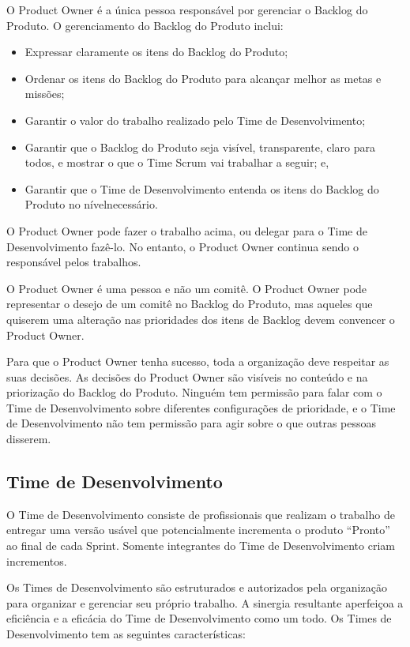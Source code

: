 O Product Owner é a única pessoa responsável por gerenciar o Backlog do Produto. O
gerenciamento do Backlog do Produto inclui:

\begin{itemize}
\item  Expressar claramente os itens do Backlog do Produto;
\item Ordenar os itens do Backlog do Produto para alcançar melhor as metas e missões;
\item  Garantir o valor do trabalho realizado pelo Time de Desenvolvimento;
\item  Garantir que o Backlog do Produto seja visível, transparente, claro para todos, e mostrar o que o Time Scrum vai trabalhar a seguir; e,
\item Garantir que o Time de Desenvolvimento entenda os itens do Backlog do Produto no nívelnecessário.
\end{itemize}

O Product Owner pode fazer o trabalho acima, ou delegar para o Time de Desenvolvimento
fazê-lo. No entanto, o Product Owner continua sendo o responsável pelos trabalhos.

O Product Owner é uma pessoa e não um comitê. O Product Owner pode representar o desejo
de um comitê no Backlog do Produto, mas aqueles que quiserem uma alteração nas
prioridades dos itens de Backlog devem convencer o Product Owner.

Para que o Product Owner tenha sucesso, toda a organização deve respeitar as suas decisões.
As decisões do Product Owner são visíveis no conteúdo e na priorização do Backlog do
Produto. Ninguém tem permissão para falar com o Time de Desenvolvimento sobre diferentes
configurações de prioridade, e o Time de Desenvolvimento não tem permissão para agir sobre
o que outras pessoas disserem.

\subsection{Time de Desenvolvimento}
\label{sub:Time de Desenvolvimento}

O Time de Desenvolvimento consiste de profissionais que realizam o trabalho de entregar uma
versão usável que potencialmente incrementa o produto “Pronto” ao final de cada Sprint.
Somente integrantes do Time de Desenvolvimento criam incrementos.

Os Times de Desenvolvimento são estruturados e autorizados pela organização para organizar
e gerenciar seu próprio trabalho. A sinergia resultante aperfeiçoa a eficiência e a eficácia do
Time de Desenvolvimento como um todo. Os Times de Desenvolvimento tem as seguintes
características:

